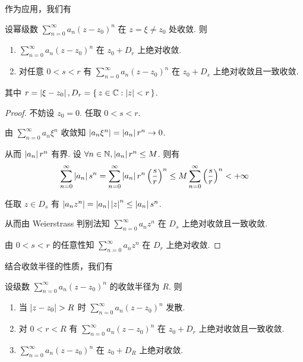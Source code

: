 作为应用，我们有

\begin{property}
    设幂级数 $\sum\limits_{n=0}^\infty a_n(z-z_0)^n$ 在 $z=\xi\ne z_0$ 处收敛. 则

    \begin{enumerate}
        \item $\sum\limits_{n=0}^\infty a_n(z-z_0)^n$ 在 $z_0+D_r$ 上绝对收敛.
        
        \item 对任意 $0<s<r$ 有 $\sum\limits_{n=0}^\infty a_n(z-z_0)^n$ 在 $z_0+D_s$ 上绝对收敛且一致收敛.
    \end{enumerate}

    其中 $r=\left\lvert{\xi-z_0}\right\rvert,D_r=\set{z\in\mathbb{C}:\left\lvert{z}\right\rvert<r}$.
\end{property}
\begin{proof}
    不妨设 $z_0=0$. 任取 $0<s<r$.

    由 $\sum\limits_{n=0}^\infty a_n\xi^n$ 收敛知 $\left\lvert{a_n\xi^n}\right\rvert=\left\lvert{a_n}\right\rvert r^n\to 0$.

    从而 $\left\lvert{a_n}\right\rvert r^n$ 有界. 设 $\forall n\in\mathbb{N},\left\lvert{a_n}\right\rvert r^n\le M$. 则有
$$
\sum_{n=0}^\infty\left\lvert{a_n}\right\rvert s^n=\sum_{n=0}^\infty\left\lvert{a_n}\right\rvert r^n\left(\frac{s}{r}\right)^n\le M\sum_{n=0}^\infty\left(\frac{s}{r}\right)^n<+\infty
$$

    任取 $z\in D_s$ 有 $\left\lvert{a_nz^n}\right\rvert=\left\lvert{a_n}\right\rvert\left\lvert{z}\right\rvert^n\le\left\lvert{a_n}\right\rvert s^n$.

    从而由 Weierstrass 判别法知 $\sum\limits_{n=0}^\infty a_nz^n$ 在 $D_s$ 上绝对收敛且一致收敛.

    由 $0<s<r$ 的任意性知 $\sum\limits_{n=0}^\infty a_nz^n$ 在 $D_r$ 上绝对收敛.
\end{proof}

结合收敛半径的性质，我们有

\begin{theorem}
    设级数 $\sum\limits_{n=0}^\infty a_n(z-z_0)^n$ 的收敛半径为 $R$. 则

    \begin{enumerate}
        \item 当 $\left\lvert{z-z_0}\right\rvert>R$ 时 $\sum\limits_{n=0}^\infty a_n(z-z_0)^n$ 发散.
        
        \item 对 $0<r<R$ 有 $\sum\limits_{n=0}^\infty a_n(z-z_0)^n$ 在 $z_0+D_r$ 上绝对收敛且一致收敛.
        
        \item $\sum\limits_{n=0}^\infty a_n(z-z_0)^n$ 在 $z_0+D_R$ 上绝对收敛.
    \end{enumerate}
\end{theorem}

